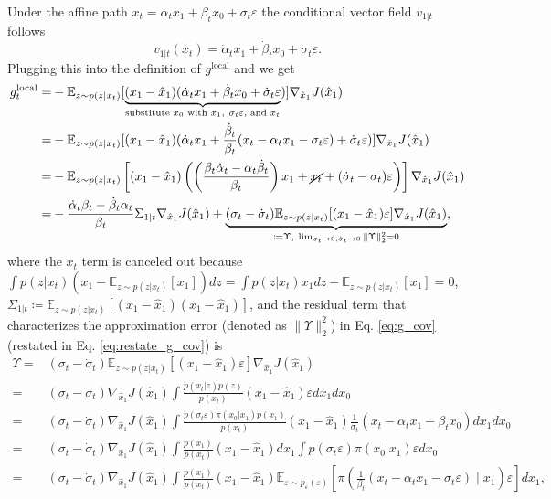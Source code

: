Under the affine path $x_t = \alpha_t x_1 + \beta_t x_0 + \sigma_t \varepsilon$ the conditional vector field $v_{1|t}$ follows
\begin{equation}
    v_{1|t}(x_t) = \dot \alpha_t x_1 + \dot\beta_t x_0 + \dot\sigma_t \varepsilon.
\end{equation}
Plugging this into the definition of $g^{\text{local}}$ and we get
\begin{align}
    \nonumber g_t^{\text{local}} = & -\mathbb{E}_{z \sim p(z|x_t)}[\underbrace{(x_1 - \hat{x}_1)(\dot \alpha_t x_1 + \dot\beta_t x_0 + \dot\sigma_t\varepsilon}_{\text{substitute } x_0 \text{ with } x_1,~ \sigma_t\varepsilon, \text{ and } x_t})] \nabla_{\hat{x}_1} J(\hat{x}_1)\\
    \nonumber =& -\mathbb{E}_{z \sim p(z|x_t)}[(x_1 - \hat{x}_1)(\dot \alpha_t x_1 + \frac{\dot\beta_t}{\beta_t} (x_t - \alpha_t x_1 - \sigma_t \varepsilon) + \dot\sigma_t\varepsilon)] \nabla_{\hat{x}_1} J(\hat{x}_1)\\
    \nonumber =& -\mathbb{E}_{z \sim p(z|x_t)}\left[
    (x_1 - \hat{x}_1)\left(
    \left(\frac{\beta_t\dot \alpha_t - \alpha_t\dot\beta_t}{\beta_t}\right) x_1 +  \cancel{x_t}  + (\dot\sigma_t - \sigma_t)\varepsilon
    \right)
    \right] 
    \nabla_{\hat{x}_1} J(\hat{x}_1)\\
    = & -{\frac{\dot\alpha_t\beta_t - \dot\beta_t\alpha_t}{\beta_t}} \Sigma_{1|t} \nabla_{\hat{x}_1}J(\hat{x}_1)
    + \underbrace{(\sigma_t - \dot\sigma_t)\mathbb{E}_{z \sim p(z|x_t)}[(x_1-\hat{x}_1)\varepsilon]\nabla_{\hat{x}_1}J(\hat{x}_1)}_{\coloneqq\Upsilon,~\lim_{\sigma_t\rightarrow 0, \dot\sigma_t \rightarrow 0}\|\Upsilon\|_2^2=0 },
\end{align}
where the $x_t$ term is canceled out because $\int p(z|x_t) (x_1 - \mathbb{E}_{z\sim p(z|x_t)}[x_1])dz = \int p(z|x_t) x_1 dz -\mathbb{E}_{z\sim p(z|x_t)}[x_1] = 0$, $\Sigma_{1|t}\coloneqq \mathbb{E}_{z \sim p(z|x_t)}\left[
(x_1 - \hat{x}_1)(x_1 - \hat{x}_1)\right]$, and the residual term that characterizes the approximation error (denoted as $\|\Upsilon\|^2_2$) in Eq. \eqref{eq:g_cov} (restated in Eq. \eqref{eq:restate_g_cov}) is
\begin{align}
    \nonumber \Upsilon = &(\sigma_t - \dot\sigma_t)\mathbb{E}_{z \sim p(z|x_t)}[(x_1-\hat{x}_1)\varepsilon]\nabla_{\hat{x}_1}J(\hat{x}_1) \\
    \nonumber =&(\sigma_t - \dot\sigma_t)\nabla_{\hat{x}_1}J(\hat{x}_1)\int \frac{p(x_t|z)p(z)}{p(x_t)}(x_1-\hat{x}_1)\varepsilon dx_1dx_0 \\
    \nonumber =&(\sigma_t - \dot\sigma_t)\nabla_{\hat{x}_1}J(\hat{x}_1)\int \frac{p(\sigma_t\varepsilon)\pi(x_0|x_1)p(x_1)}{p(x_t)}(x_1-\hat{x}_1)\frac{1}{\sigma_t}(x_t - \alpha_t x_1 - \beta_t x_0) dx_1dx_0 \\
    \nonumber =&(\sigma_t - \dot\sigma_t)\nabla_{\hat{x}_1}J(\hat{x}_1)\int \frac{p(x_1)}{p(x_t)}(x_1-\hat{x}_1) dx_1 \int p(\sigma_t\varepsilon)\pi(x_0|x_1) \varepsilon dx_0 \\
    =&(\sigma_t - \dot\sigma_t)\nabla_{\hat{x}_1}J(\hat{x}_1)\int \frac{p(x_1)}{p(x_t)}(x_1-\hat{x}_1) 
    \mathbb{E}_{\varepsilon\sim p_\varepsilon(\varepsilon)}
    \left[{\pi\left(\frac{1}{\beta_t}(x_t - \alpha_t x_1 - \sigma_t \varepsilon)\mid x_1\right)} \varepsilon \right]dx_1 ,
\end{align}
